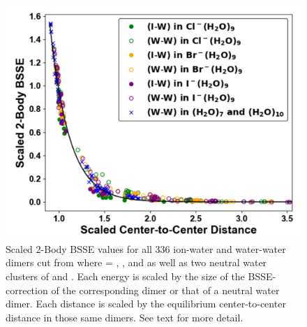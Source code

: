 \begin{figure}[h]
\uwsinglespace
\centering
\includegraphics[width=.8\textwidth]{Figures/Chapter_3/figure_12.pdf}
\caption[Scaled 2-Body BSSE values for all 336 ion-water and water-water dimers cut from  where  = , , and  as well as two neutral water clusters of  and . Each energy is scaled by the size of the BSSE-correction of the corresponding  dimer or that of a neutral water dimer. Each distance is scaled by the equilibrium center-to-center distance in those same dimers. See text for more detail.]{Scaled 2-Body BSSE values for all 336 ion-water and water-water dimers cut from  where  = , , and  as well as two neutral water clusters of  and . Each energy is scaled by the size of the BSSE-correction of the corresponding  dimer or that of a neutral water dimer. Each distance is scaled by the equilibrium center-to-center distance in those same dimers. See text for more detail.}
\label{fig:MBE_II_12}
\end{figure}